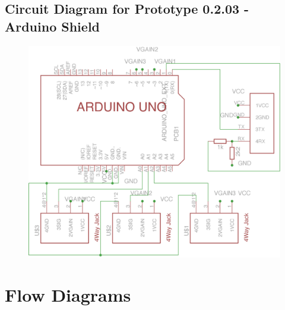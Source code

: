 \subsection{Circuit Diagram for Prototype 0.2.03 - Arduino Shield}
\label{ardshieldsch}
\begin{figure}[H]
\centering
\includegraphics[scale = 1]{Images/ard_schematic_01}
\end{figure}



\section{Flow Diagrams} \label{Flow Diagrams}

